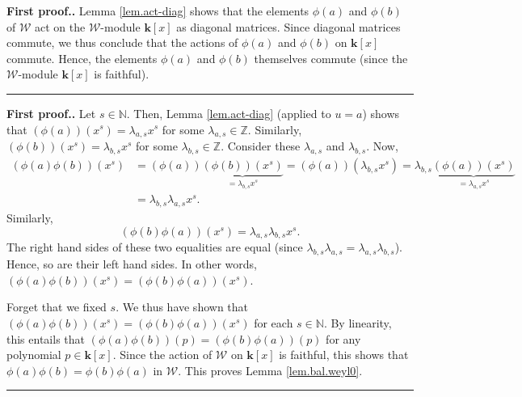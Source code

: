 \documentclass[numbers=enddot,12pt,final,onecolumn,notitlepage]{scrartcl}%
\theoremstyle{definition}
\newenvironment{proof}[1][Proof]{\noindent\textbf{#1.} }{\ \rule{0.5em}{0.5em}}
\newcommand{\W}{\mathcal{W}}
\newcommand{\kk}{\mathbf{k}}
\newcommand{\NN}{\mathbb{N}}
\newcommand{\ZZ}{\mathbb{Z}}
\newcommand{\tup}[1]{\left( #1 \right)}
\newcommand{\ive}[1]{\left[ #1 \right]}
\newenvironment{verlong}{}{}
\newenvironment{vershort}{}{}
\begin{document}
\begin{vershort}
\begin{proof}[First proof.]
Lemma \ref{lem.act-diag} shows that the elements $\phi\tup{a}$ and $\phi\tup{b}$ of $\W$ act on the $\W$-module $\kk\ive{x}$ as diagonal matrices.
Since diagonal matrices commute, we thus conclude that the actions of $\phi\tup{a}$ and $\phi\tup{b}$ on $\kk\ive{x}$ commute.
Hence, the elements $\phi\tup{a}$ and $\phi\tup{b}$ themselves commute (since the $\W$-module $\kk\ive{x}$ is faithful).
\end{proof}
\end{vershort}

\begin{verlong}
\begin{proof}[First proof.]
Let $s\in\NN$. Then,
Lemma \ref{lem.act-diag} (applied to $u=a$) shows that
$\left(  \phi\left(  a\right)  \right)  \left(  x^{s}\right)  =\lambda
_{a,s}x^{s}$ for some $\lambda_{a,s}\in\ZZ$. Similarly, $\left(
\phi\left(  b\right)  \right)  \left(  x^{s}\right)  =\lambda_{b,s}x^{s}$ for
some $\lambda_{b,s}\in\ZZ$. Consider these $\lambda_{a,s}$ and
$\lambda_{b,s}$.
Now,
\begin{align*}
\left(  \phi\tup{a} \phi\tup{b} \right)  \left(  x^{s}\right) 
&=\left(
\phi\left(  a\right)  \right)  \underbrace{\left(  \phi\left(  b\right)
\right)  \left(  x^{s}\right)  }_{=\lambda_{b,s}x^{s}}=\left(  \phi\left(
a\right)  \right)  \left(  \lambda_{b,s}x^{s}\right)  =\lambda_{b,s}%
\underbrace{\left(  \phi\left(  a\right)  \right)  \left(  x^{s}\right)
}_{=\lambda_{a,s}x^{s}} \\
&=\lambda_{b,s}\lambda_{a,s}x^{s}.
\end{align*}
Similarly,
\[
\left(  \phi\tup{b} \phi\tup{a}  \right)  \left(  x^{s}\right)  =\lambda
_{a,s}\lambda_{b,s}x^{s}.
\]
The right hand sides of these two equalities are equal (since $\lambda
_{b,s}\lambda_{a,s}=\lambda_{a,s}\lambda_{b,s}$). Hence, so are their left
hand sides. In other words, $\left( \phi\tup{a} \phi\tup{b} \right)  \left(
x^{s}\right)  =\left(  \phi\tup{b} \phi\tup{a} \right)  \left(  x^{s}\right)  $.

Forget that we fixed $s$. We thus have shown that
$\left( \phi\tup{a} \phi\tup{b} \right)  \left(
x^{s}\right)  =\left(  \phi\tup{b} \phi\tup{a} \right)  \left(  x^{s}\right)  $
for each $s\in\NN$. By linearity, this
entails that $\left( \phi\tup{a} \phi\tup{b} \right)  \left(  p\right)
=\left( \phi\tup{b} \phi\tup{a} \right)  \left(  p\right)  $ for any
polynomial $p\in\kk\left[  x\right]  $. Since the action of
$\W$ on $\kk\left[  x\right]  $ is faithful, this shows that
$\phi\tup{a} \phi\tup{b} = \phi\tup{b} \phi\tup{a}$ in $\W$.
This proves Lemma \ref{lem.bal.weyl0}.
\end{proof}
\end{verlong}
\end{document}
